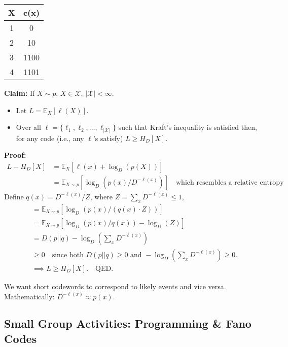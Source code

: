\begin{center}
\begin{tabular}{c c}
X & c(x) \\
\hline
1 & 0 \\
2 & 10 \\
3 & 1100 \\
4 & 1101 \\
\end{tabular}
\end{center}

\textbf{Claim:} If \( X \sim p \), \( X \in \mathcal{X} \), \( |\mathcal{X}| < \infty \).

\begin{itemize}
    \item Let \( L = \mathbb{E}_X[\ell(X)] \).
    \item Over all \( \ell=\{\ell_1, \ell_2, \ldots, \ell_{|\mathcal{X}|}\} \) such that Kraft’s inequality is satisfied then, for any code (i.e., any \( \ell \)’s satisfy) \( L \geq H_D[X] \).
\end{itemize}

\textbf{Proof:}
\begin{align*}
L - H_D[X] &= \mathbb{E}_X[\ell(x) + \log_D(p(X))] \\
&= \mathbb{E}_{X \sim p}[\log_D(p(x) / D^{-\ell(x)})] \quad \text{which resembles a relative entropy}
\end{align*}
Define \( q(x) = D^{-\ell(x)} / Z \), where \( Z = \sum_x D^{-\ell(x)} \leq 1 \),
\begin{align*}
&= \mathbb{E}_{X \sim p}[\log_D(p(x) / (q(x) \cdot Z))] \\
&= \mathbb{E}_{X \sim p}[\log_D(p(x) / q(x)) - \log_D(Z)] \\
&= D(p || q) - \log_D\left(\sum_x D^{- \ell(x)}\right) \\
&\geq 0 \quad \text{since both } D(p || q) \geq 0 \text{ and } -\log_D\left(\sum_x D^{- \ell(x)}\right) \geq 0. \\
&\implies L \geq H_D[X]. \quad \text{QED.}
\end{align*}

We want short codewords to correspond to likely events and vice versa. Mathematically: \( D^{- \ell(x)} \approx p(x) \).

\subsection{Small Group Activities: Programming \& Fano Codes}

